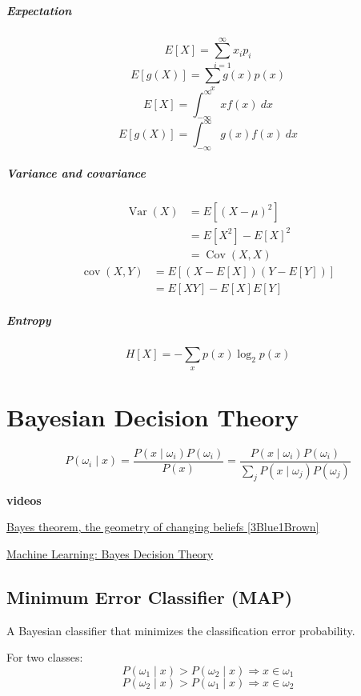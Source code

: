 \documentclass{report}
\begin{document}
\paragraph*{Expectation}
\[E[X] = \sum_{i=1}^\infty x_i p_i\]
\[E[g(X)] = \sum_{x} g(x) p(x)\]
\[E[X] = \int_{-\infty}^\infty x f(x)\ dx\]
\[E[g(X)] = \int_{-\infty}^\infty g(x) f(x)\ dx\]

\paragraph*{Variance and covariance}
\[\begin{split}
	\operatorname{Var}(X) &= E[(X - \mu)^2] \\
	&= E[X^2] - E[X]^2 \\
	&= \operatorname{Cov}(X, X)
\end{split}\]
\[\begin{split}
	\operatorname{cov}(X, Y) &= E{\left[(X - E[X])(Y - E[Y])\right]} \\
	&= E[X Y] - E[X] E[Y]
\end{split}\]
\paragraph*{Entropy}
\[H[X] = - \sum_x p(x) \log_2 p(x)\]


\chapter{Bayesian Decision Theory}

\[P(\omega_i \mid x) = \frac{P(x \mid \omega_i) P(\omega_i)}{P(x)} = \frac{P(x \mid \omega_i) P(\omega_i)}{\sum\limits_j P(x \mid \omega_j) P(\omega_j)}\]

\begin{mdframed}
	\textbf{videos}

	\href{https://www.youtube.com/watch?v=HZGCoVF3YvM}{Bayes theorem, the geometry of changing beliefs [3Blue1Brown]}

	\href{https://www.youtube.com/watch?v=4JscUHGWaB4}{Machine Learning: Bayes Decision Theory}
\end{mdframed}

\section{Minimum Error Classifier (MAP)}
A Bayesian classifier that minimizes the classification error probability.

For two classes:
\[P(\omega_1 \mid x) > P(\omega_2 \mid x) \Rightarrow x \in \omega_1\]
\[P(\omega_2 \mid x) > P(\omega_1 \mid x) \Rightarrow x \in \omega_2\]
\end{document}
